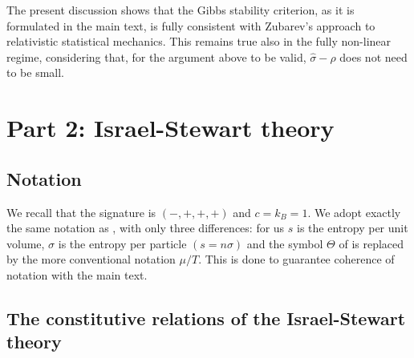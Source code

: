 \documentclass[a4paper, amsfonts, amssymb, amsmath, reprint, showkeys, nofootinbib, twoside, onecolumn,notitlepage]{revtex4-1}
\begin{document}
The present discussion shows that the Gibbs stability criterion, as it is formulated in the main text, is fully consistent with Zubarev's approach to relativistic statistical mechanics. This remains true also in the fully non-linear regime, considering that, for the argument above to be valid, $\hat{\sigma}-\hat{\rho}$ does not need to be small. 






\newpage


\section*{Part 2: Israel-Stewart theory}
\subsection{Notation}

We recall that the signature is $(-,+,+,+)$ and $c=k_B=1$. 
We adopt exactly the same notation as \citet{Hishcock1983}, with only three differences: for us $s$ is the entropy per unit volume, $\sigma$ is the entropy per particle $(s=n\sigma)$ and the symbol $\Theta$ of \cite{Hishcock1983} is replaced by the more conventional notation $\mu/T$. This is done to guarantee coherence of notation with the main text.



\subsection{The constitutive relations of the Israel-Stewart theory}
\end{document}
